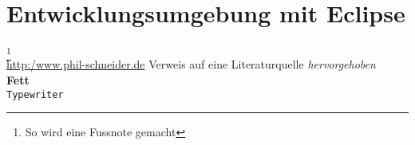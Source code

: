 \section{Entwicklungsumgebung mit Eclipse} \label{sec:impl-Entwicklungsumgebung}


\footnote{So wird eine Fussnote gemacht}\\
\url{http:/www.phil-schneider.de}
\citep{Frotscher2004b} Verweis auf eine Literaturquelle
\emph{hervorgehoben}\\
\textbf{Fett}\\
\texttt{Typewriter}\\

















\label{sec:impl-Entwicklungsumgebung-ende}
